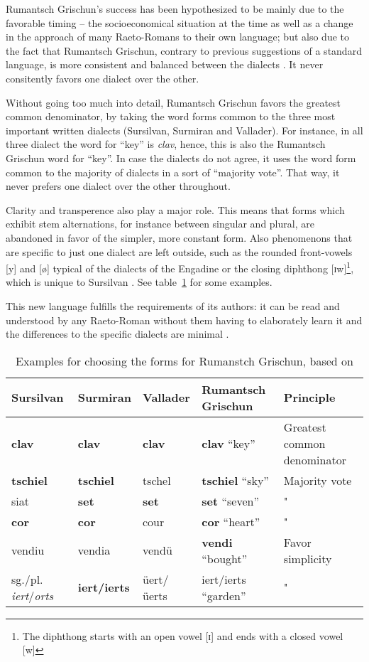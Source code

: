 Rumantsch Grischun's success has been hypothesized to be mainly due to the favorable timing -- the socioeconomical situation at the time as well as a change in the approach of many Raeto-Romans to their own language; but also due to the fact that Rumantsch Grischun, contrary to previous suggestions of a standard language, is more consistent and balanced between the dialects \autocite[69]{liver1999}. 
It never consitently favors one dialect over the other.

Without going too much into detail, Rumantsch Grischun favors the greatest common denominator, by  taking the word forms common to the three most important written dialects (Sursilvan, Surmiran and Vallader). For instance, in all three dialect the word for \enquote{key} is \emph{clav}, hence, this is also the Rumantsch Grischun word for \enquote{key}.
In case the dialects do not agree, it uses the word form common to the majority of dialects in a sort of \enquote{majority vote}. 
That way, it never prefers one dialect over the other throughout. 

Clarity and transperence also play a major role. 
This means that forms which exhibit stem alternations, for instance between singular and plural, are abandoned in favor of the simpler, more constant form.
Also phenomenons that are specific to just one dialect are left outside, such as the rounded front-vowels [y] and [ø] typical of the dialects of the Engadine or the closing diphthong [ɪw]\footnote{The diphthong starts with an open vowel [ɪ] and ends with a closed vowel [w]}, which is unique to Sursilvan \autocite[70]{liver1999}. 
See table~\ref{tab:rg-examples} for some examples.

This new language fulfills the requirements of its authors: it can be read and understood by any Raeto-Roman without them having to elaborately learn it and the differences to the specific dialects are minimal \autocite[72]{liver1999}. 


\begin{table}
\centering
\begin{tabular}{lllll}
\toprule
Sursilvan & Surmiran & Vallader & Rumantsch Grischun & Principle \\
\midrule
\textbf{clav}	  &  \textbf{clav}    &  \textbf{clav}    & \textbf{clav}  \enquote{key}  & Greatest common denominator \\
\textbf{tschiel}       &   \textbf{tschiel}   & tschel      & \textbf{tschiel} \enquote{sky} & Majority vote \\
siat 	 & \textbf{set}      & \textbf{set}      & \textbf{set} \enquote{seven} & " \\
\textbf{cor} & \textbf{cor} & cour & \textbf{cor} \enquote{heart} & " \\
vendiu & vendia & vendü & \textbf{vendi} \enquote{bought} & Favor simplicity \\
sg./pl. \emph{iert}/\emph{orts} & \textbf{iert/ierts} & üert/üerts & iert/ierts \enquote{garden} & " \\
\bottomrule

\end{tabular}
\caption{Examples for choosing the forms for Rumanstch Grischun, based on \cite[70-71]{liver1999}}
\label{tab:rg-examples}
\end{table}


